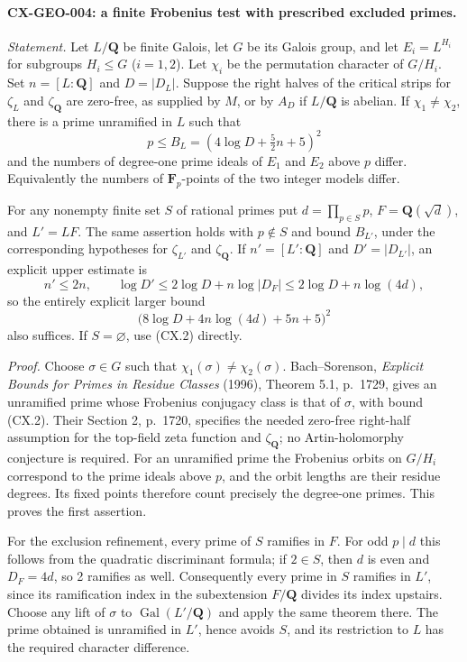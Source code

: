 \documentclass[11pt,a4paper]{article}
\begin{document}
\paragraph{CX-GEO-004: a finite Frobenius test with prescribed excluded primes.}
\emph{Statement.} Let $L/\mathbf Q$ be finite Galois, let $G$ be its Galois
group, and let $E_i=L^{H_i}$ for subgroups $H_i\leq G$ ($i=1,2$).
Let $\chi_i$ be the permutation character of $G/H_i$. Set $n=[L:\mathbf Q]$
and $D=|D_L|$. Suppose the right halves of the critical strips for
$\zeta_L$ and $\zeta_{\mathbf Q}$ are zero-free, as supplied by $M$, or by
$A_D$ if $L/\mathbf Q$ is abelian. If $\chi_1\ne\chi_2$, there is a prime
unramified in $L$ such that
\[
       p\leq B_L=(4\log D+\tfrac52 n+5)^2                  \tag{CX.2}
\]
and the numbers of degree-one prime ideals of $E_1$ and $E_2$ above $p$
differ. Equivalently the numbers of $\mathbf F_p$-points of the two integer
models differ.

For any nonempty finite set $S$ of rational primes put
$d=\prod_{p\in S}p$, $F=\mathbf Q(\sqrt d)$, and $L'=LF$.
The same assertion holds with $p\notin S$ and bound $B_{L'}$, under the
corresponding hypotheses for $\zeta_{L'}$ and $\zeta_{\mathbf Q}$.
If $n'=[L':\mathbf Q]$ and $D'=|D_{L'}|$, an explicit upper estimate is
\[
 n'\leq2n,\qquad \log D'\leq2\log D+n\log|D_F|
                     \leq2\log D+n\log(4d),               \tag{CX.3}
\]
so the entirely explicit larger bound
\[
        \bigl(8\log D+4n\log(4d)+5n+5\bigr)^2            \tag{CX.4}
\]
also suffices. If $S=\varnothing$, use (CX.2) directly.

\emph{Proof.} Choose $\sigma\in G$ such that
$\chi_1(\sigma)\ne\chi_2(\sigma)$. Bach--Sorenson,
\emph{Explicit Bounds for Primes in Residue Classes} (1996), Theorem 5.1,
p.~1729, gives an unramified prime whose Frobenius conjugacy class is that
of $\sigma$, with bound (CX.2). Their Section 2, p.~1720, specifies the
needed zero-free right-half assumption for the top-field zeta function and
$\zeta_{\mathbf Q}$; no Artin-holomorphy conjecture is required.
For an unramified prime the Frobenius orbits on $G/H_i$ correspond to the
prime ideals above $p$, and the orbit lengths are their residue degrees.
Its fixed points therefore count precisely the degree-one primes.
This proves the first assertion.

For the exclusion refinement, every prime of $S$ ramifies in $F$. For odd
$p\mid d$ this follows from the quadratic discriminant formula; if $2\in S$,
then $d$ is even and $D_F=4d$, so 2 ramifies as well. Consequently every
prime in $S$ ramifies in $L'$, since its ramification index in the subextension
$F/\mathbf Q$ divides its index upstairs. Choose any lift of $\sigma$ to
$\operatorname{Gal}(L'/\mathbf Q)$ and apply the same theorem there. The
prime obtained is unramified in $L'$, hence avoids $S$, and its restriction
to $L$ has the required character difference.
\end{document}
